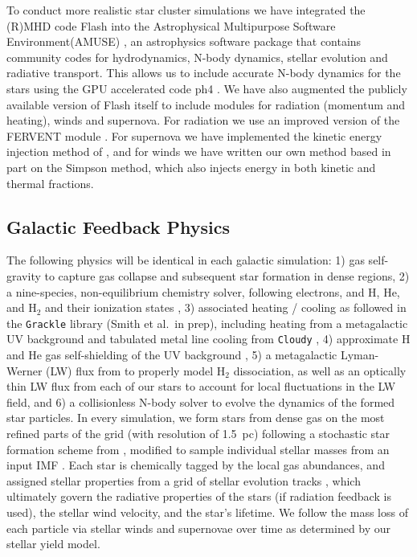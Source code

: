\documentclass[11pt]{article}
\begin{document}
To conduct more realistic star cluster simulations we have integrated the (R)MHD code Flash into the Astrophysical Multipurpose Software Environment(AMUSE) \citep{AMUSE}, an astrophysics software package that contains community codes for hydrodynamics, N-body dynamics, stellar evolution and radiative transport. This allows us to include accurate N-body dynamics for the stars using the GPU accelerated code ph4 \citep{ph4}. We have also augmented the publicly available version of Flash itself to include modules for radiation (momentum and heating), winds and supernova. For radiation we use an improved version of the FERVENT module \citep{baczynski_fervent:_2015}. For supernova we have implemented the kinetic energy injection method of \citet{simpson_kinetic_2015}, and for winds we have written our own method based in part on the Simpson method, which also injects energy in both kinetic and thermal fractions.

\subsection{Galactic Feedback Physics}


The following physics will be identical in each galactic simulation: 1) gas self-gravity to capture gas collapse and subsequent star formation in dense regions, 2) a nine-species, non-equilibrium chemistry solver, following electrons, and H, He, and H$_{2}$ and their ionization states \citep{Anninos1997, Abel1997}, 3) associated heating / cooling as followed in the \texttt{Grackle} library (Smith et al.\ in prep), including heating from a metagalactic UV background \citep{HM2012} and tabulated metal line cooling from \texttt{Cloudy} \citep{Cloudy2013}, 4) approximate H and He gas self-shielding of the UV background \citep{Rahmati2013}, 5) a metagalactic Lyman-Werner (LW) flux from \cite{HM2012} to properly model H$_{2}$ dissociation, as well as an optically thin LW flux from each of our stars to account for local fluctuations in the LW field, and 6) a collisionless N-body solver to evolve the dynamics of the formed star particles. In every simulation, we form stars from dense gas on the most refined parts of the grid (with resolution of 1.5~pc) following a stochastic star formation scheme from \cite{Goldbaum2015, Goldbaum2016}, modified to sample individual stellar masses from an input IMF \citep{Salpeter1955}. Each star is chemically tagged by the local gas abundances, and assigned stellar properties from a grid of stellar evolution tracks \citep{Bressan2012}, which ultimately govern the radiative properties of the stars (if radiation feedback is used), the stellar wind velocity, and the star's lifetime. We follow the mass loss of each particle via stellar winds and supernovae over time as determined by our stellar yield model.
\end{document}
